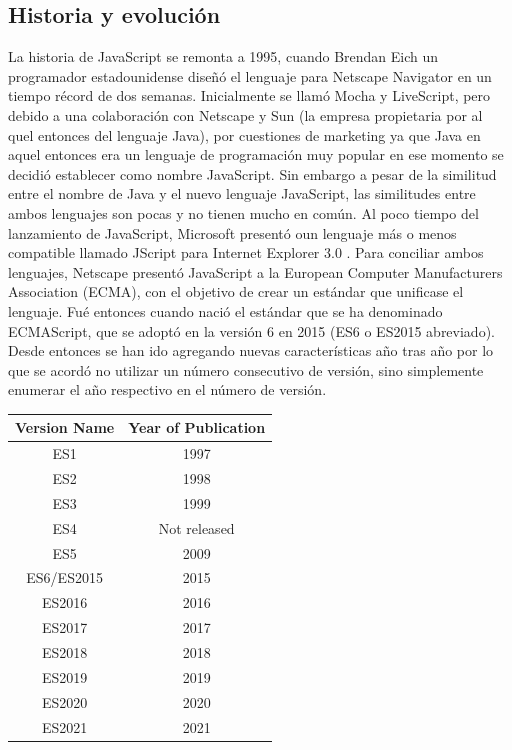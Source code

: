 \documentclass[a4paper, 11pt]{book}
\begin{document}
\subsection{Historia y evolución}
La historia de JavaScript se remonta a 1995, cuando Brendan Eich un programador estadounidense diseñó el lenguaje para Netscape Navigator en un tiempo récord de dos semanas. Inicialmente se llamó Mocha y LiveScript, pero debido  a una colaboración con Netscape y Sun (la empresa propietaria por al quel entonces del lenguaje Java), por cuestiones de marketing ya que Java en aquel entonces era un lenguaje de programación muy popular en ese momento se decidió establecer como nombre JavaScript.
Sin embargo a pesar de la similitud entre el nombre de Java y el nuevo lenguaje JavaScript, las similitudes entre ambos lenguajes son pocas y no tienen mucho en común.
Al poco tiempo del lanzamiento de JavaScript, Microsoft presentó oun lenguaje más o menos compatible llamado JScript para Internet Explorer 3.0 .
Para conciliar ambos lenguajes, Netscape presentó JavaScript a la European Computer Manufacturers Association (ECMA), con el objetivo de crear un estándar que unificase el lenguaje. Fué entonces cuando nació el estándar que se ha denominado ECMAScript, que se adoptó en la versión 6 en 2015 (ES6 o ES2015 abreviado). Desde entonces se han ido agregando nuevas características año tras año por lo que se acordó no utilizar un número consecutivo de versión, sino simplemente enumerar el año respectivo en el número de versión.
\begin{center}
  \begin{tabular}{|c|c|}
    \hline
    \textbf{Version Name} & \textbf{Year of Publication} \\
    \hline
    ES1 & 1997 \\
    ES2 & 1998 \\
    ES3 & 1999 \\
    ES4 & Not released \\
    ES5 & 2009 \\
    ES6/ES2015 & 2015 \\
    ES2016 & 2016 \\
    ES2017 & 2017 \\
    ES2018 & 2018 \\
    ES2019 & 2019 \\
    ES2020 & 2020 \\
    ES2021 & 2021 \\
    \hline
  \end{tabular}
\end{center}
\end{document}

